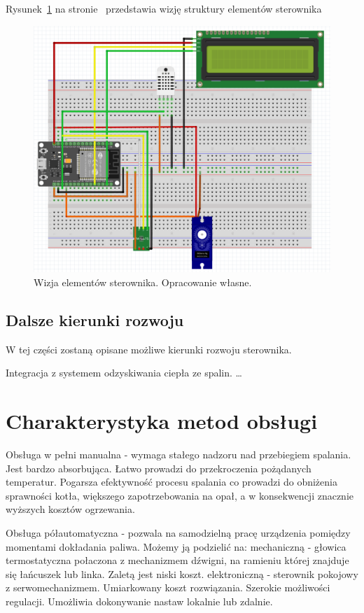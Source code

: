 \documentclass[12pt]{report}
\begin{document}
 Rysunek~\ref{fig:wizja} na stronie~\pageref{fig:wizja} przedstawia wizję struktury elementów sterownika
 \begin{figure}[ht]
\centering
\includegraphics[width=0.8 \textwidth]{fig/fritzing_bredboard_v1.png}
\caption{Wizja elementów sterownika. Opracowanie własne.}
\label{fig:wizja}
\end{figure}
 
 \section{Dalsze kierunki rozwoju}
 W tej części zostaną opisane możliwe kierunki rozwoju sterownika.
 
 Integracja z systemem odzyskiwania ciepła ze spalin.
 \ldots
 

 \chapter{Charakterystyka metod obsługi} 
 Obsługa w pełni manualna - wymaga stałego nadzoru nad przebiegiem spalania. Jest bardzo absorbująca. Łatwo prowadzi do przekroczenia pożądanych temperatur. Pogarsza efektywność procesu spalania co prowadzi do obniżenia sprawności kotła, większego zapotrzebowania na opał, a w konsekwencji znacznie wyższych kosztów ogrzewania.
 
 Obsługa półautomatyczna - pozwala na samodzielną pracę urządzenia pomiędzy momentami dokładania paliwa. Możemy ją podzielić na:
 mechaniczną - głowica termostatyczna połaczona z mechanizmem dźwigni, na ramieniu której znajduje się łańcuszek lub linka. Zaletą jest niski koszt.
 elektroniczną - sterownik pokojowy z serwomechanizmem. Umiarkowany koszt rozwiązania. Szerokie możliwości regulacji. Umożliwia dokonywanie nastaw lokalnie lub zdalnie.
 
\end{document}

